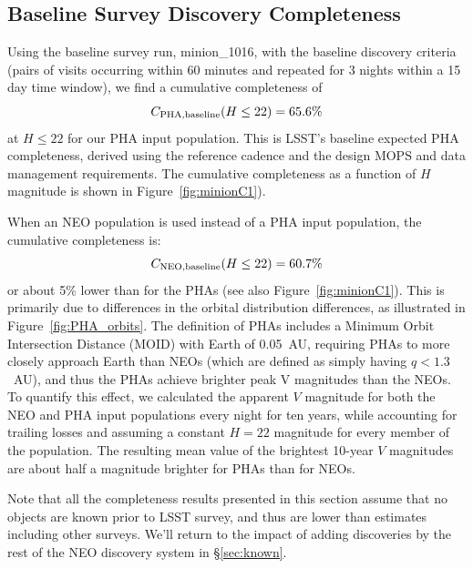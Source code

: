 \subsection{Baseline Survey Discovery Completeness}

Using the baseline survey run, minion\_1016, with the baseline discovery
criteria (pairs of visits occurring within 60 minutes and
repeated for 3 nights within a 15 day time window), we find a cumulative
completeness of
\begin{equation}
C_{\rm PHA, baseline}(H\le22) = 65.6\%
\end{equation}
at $H\le22$ for our PHA input population. This is LSST's baseline expected PHA completeness, derived using the reference cadence and the design MOPS and data management requirements. The cumulative completeness as a function of $H$ magnitude is shown in Figure~\ref{fig:minionC1}). 

When an NEO population is used instead of a PHA input population, the cumulative completeness is:
\begin{equation}
C_{\rm NEO, baseline}(H\le22) = 60.7\%
\end{equation}
or about 5\% lower than for the PHAs
(see also Figure~\ref{fig:minionC1}). This is primarily due to differences in the orbital distribution differences, as illustrated in Figure~\ref{fig:PHA_orbits}. The definition of PHAs includes a Minimum Orbit Intersection Distance (MOID) with Earth of 0.05~AU, requiring PHAs to more closely approach Earth than NEOs (which are defined as simply having $q<1.3$~AU), and thus the PHAs achieve brighter peak V magnitudes than the NEOs. To quantify this effect, we calculated the apparent $V$ magnitude for both the NEO and PHA input populations every night for ten years, while accounting for trailing losses and assuming a constant $H=22$ magnitude for every member of the population. The resulting mean value of the
brightest 10-year $V$ magnitudes are about half a magnitude brighter for PHAs than for NEOs.

Note that all the completeness results presented in this section assume that no objects are known prior to LSST survey, and thus are lower than estimates including other surveys. We'll return to the impact of adding discoveries by the  rest of the NEO discovery system in \S\ref{sec:known}. 

